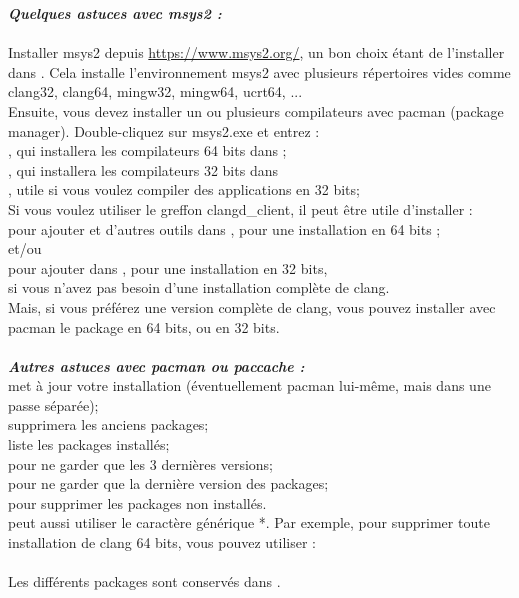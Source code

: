 \textbf{\textit{Quelques astuces avec msys2 : }}\\
\\
Installer msys2 depuis \url{https://www.msys2.org/}, un bon choix étant de l'installer dans . Cela installe l'environnement msys2 avec plusieurs répertoires vides comme clang32, clang64, mingw32, mingw64, ucrt64, ...\\
Ensuite, vous devez installer un ou plusieurs compilateurs avec pacman (package manager). Double-cliquez sur msys2.exe et entrez :\\
, qui installera les compilateurs 64 bits dans  ; \\
, qui installera les compilateurs 32 bits dans \\
, utile si vous voulez compiler des applications en 32 bits;\\
Si vous voulez utiliser le greffon clangd\_client, il peut être utile d'installer :\\
 pour ajouter  et d'autres outils dans , pour une installation en 64 bits ;\\
et/ou \\
 pour ajouter  dans , pour une installation en 32 bits,\\
si vous n'avez pas besoin d'une installation complète de clang.\\
Mais, si vous préférez une version complète de clang, vous pouvez installer avec pacman le package  en 64 bits, ou  en 32 bits.\\
\\
\textbf{\textit{Autres astuces avec pacman ou paccache :}}\\
 met à jour votre installation (éventuellement pacman lui-même, mais dans une passe séparée);\\
 supprimera les anciens packages;\\
 liste les packages installés;\\
 pour ne garder que les 3 dernières versions;\\
 pour ne garder que la dernière version des packages;\\
 pour supprimer les packages non installés.\\
 peut aussi utiliser le caractère générique *. Par exemple, pour supprimer toute installation de clang 64 bits, vous pouvez utiliser :\\
\\
Les différents packages sont conservés dans .

